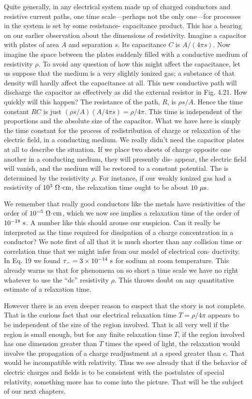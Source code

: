 Quite generally, in any electrical system made up of charged conductors
and resistive current paths, one time scale---perhaps not the
only one---for processes in the system is set by some resistance-
capacitance product. This has a bearing on our earlier observation
about the dimensions of resistivity. Imagine a capacitor with plates
of area $A$ and separation $s$. Its capacitance $C$ is $A/(4\pi s)$. Now
imagine the space between the plates suddenly filled with a conductive
medium of resistivity $\rho$. To avoid any question of how this might
affect the capacitance, let us suppose that the medium is a very
slightly ionized gas; a substance of that density will hardly affect the
capacitance at all. This new conductive path will discharge the
capacitor as effectively as did the external resistor in Fig. 4.21. How
quickly will this happen? The resistance of the path, $R$, is $\rho s/A$.
Hence the time constant $RC$ is just $(\rho s/A)(A/4\pi s) = \rho/4\pi$. This
time is independent of the proportions and the absolute size of the
capacitor. What we have here is simply the time constant for the
process of redistribution of charge or relaxation of the electric field,
in a conducting medium. We really didn't need the capacitor plates
at all to describe the situation. If we place two sheets of charge opposite
one another in a conducting medium, they will presently dis-
appear, the electric field will vanish, and the medium will be restored
to a constant potential. The  is determined by the
resistivity $\rho$. For instance, if our weakly ionized gas had a resistivity
of $10^3\ \Omega\!\cdot\!\textup{cm}$, the relaxation time ought to be about $10\ \mu\sunit$.

We remember that really good conductors like the metals have
resistivities of the order of $10^{-5}\ \ohmunit\unitdot\cmunit$, which we now see implies
a relaxation time of the order of $10^{-18}\ \sunit$. A number like this should
arouse our suspicion. Can it really be interpreted as the time required
for dissipation of a charge concentration in a conductor? We
note first of all that it is much shorter than any collision time or correlation
time that we might infer from our model of electrical con-
ductivity. In Eq. 19 we found $\tau_- = 3\times 10^{-14}\ \textup{s}$ for sodium at
room temperature. This already warns us that for phenomena on
so short a time scale we have no right whatever to use the ``dc'' resistivity
$\rho$. This throws doubt on any quantitative estimate of a
relaxation time.

However there is an even deeper reason to suspect that the story
is not complete. That is the curious fact that our electrical relaxation
time $T = \rho/4\pi$ appears to be independent of the size of the region
involved. That is all very well if the region is small enough, but for
any finite relaxation time $T$, if the region involved has one dimension
greater than $T$ times the speed of light, the relaxation would involve
the propagation of a charge readjustment at a speed greater than $c$.
That would be incompatible with relativity. Thus we see already
that if the behavior of electric charges and fields is to be consistent
with the postulates of special relativity, something more has to come
into the picture. That will be the subject of our next chapters.

